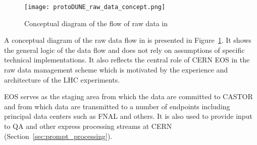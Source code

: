 \begin{figure}[tbh]
\centering\texttt{[image: protoDUNE\_raw\_data\_concept.png]}
\caption{\label{fig:raw_concept}Conceptual diagram of the flow of raw data in \pdsp}
\end{figure}


A conceptual diagram of the raw data flow in \pdsp is presented in Figure~\ref{fig:raw_concept}. It shows the general logic
of the data flow and does not rely on assumptions of specific technical implementations. 
It also reflects the central role of CERN EOS in the \pdsp raw data management scheme which is motivated by the experience
and architecture of the LHC experiments.

EOS serves as the staging area from which the data are committed to CASTOR
and from which data are transmitted to a number of endpoints including principal data centers such as FNAL and others.
It is also used to provide input to QA and other express processing streams at CERN (Section~\ref{sec:prompt_processing}).


